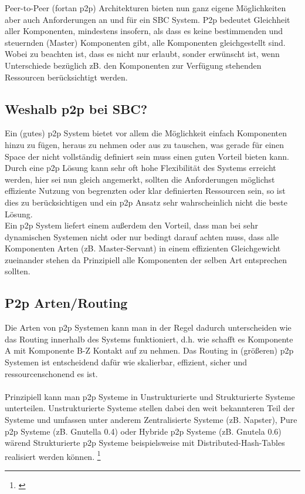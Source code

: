 \documentclass[a4paper,12pt]{scrreprt}
\begin{document}
			Peer-to-Peer (fortan p2p) Architekturen bieten nun ganz eigene Möglichkeiten aber auch Anforderungen an und für ein SBC System. P2p bedeutet Gleichheit aller Komponenten, mindestens insofern, als dass es keine bestimmenden und steuernden (Master) Komponenten gibt, alle Komponenten gleichgestellt sind. Wobei zu beachten ist, dass es nicht nur erlaubt, sonder erwünscht ist, wenn Unterschiede bezüglich zB. den Komponenten zur Verfügung stehenden Ressourcen berücksichtigt werden. 
			
			\subsection{Weshalb p2p bei SBC?}
				
				Ein (gutes) p2p System bietet vor allem die Möglichkeit einfach Komponenten hinzu zu fügen, heraus zu nehmen oder aus zu tauschen, was gerade für einen Space der nicht vollständig definiert sein muss einen guten Vorteil bieten kann. Durch eine p2p Lösung kann sehr oft hohe Flexibilität des Systems erreicht werden, hier sei nun gleich angemerkt, sollten die Anforderungen möglichst effiziente Nutzung von begrenzten oder klar definierten Ressourcen sein, so ist dies zu berücksichtigen und ein p2p Ansatz sehr wahrscheinlich nicht die beste Lösung. \\
				Ein p2p System liefert einem außerdem den Vorteil, dass man bei sehr dynamischen Systemen nicht oder nur bedingt darauf achten muss, dass alle Komponenten Arten (zB. Master-Servant) in einem effizienten Gleichgewicht zueinander stehen da Prinzipiell alle Komponenten der selben Art entsprechen sollten.
				
			\subsection{P2p Arten/Routing}
			
				Die Arten von p2p Systemen kann man in der Regel dadurch unterscheiden wie das Routing innerhalb des Systems funktioniert, d.h. wie schafft es Komponente A mit Komponente B-Z Kontakt auf zu nehmen. Das Routing in (größeren) p2p Systemen ist entscheidend dafür wie skalierbar, effizient, sicher und ressourcenschonend es ist.
				\\\\Prinzipiell kann man p2p Systeme in Unstrukturierte und Strukturierte Systeme unterteilen. Unstrukturierte Systeme stellen dabei den weit bekannteren Teil der Systeme und umfassen unter anderem Zentralisierte Systeme (zB. Napster), Pure p2p Systeme (zB. Gnutella 0.4) oder Hybride p2p Systeme (zB. Gnutela 0.6) wärend Strukturierte p2p Systeme beispielsweise mit Distributed-Hash-Tables realisiert werden können. \footnote{\cite{Steinmetz2005}}
				
\end{document}
